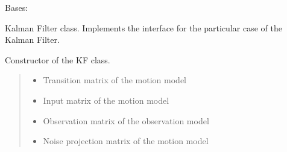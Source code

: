 \documentclass[letterpaper,10pt,english]{sphinxmanual}
\begin{document}
\begin{fulllineitems}
\label{\detokenize{KF:KF.KF}}
\pysigstartsignatures
{}
\pysigstopsignatures
\sphinxAtStartPar
Bases: 

\sphinxAtStartPar
Kalman Filter class. Implements the  interface for the particular case of the Kalman Filter.

\begin{fulllineitems}
\label{\detokenize{KF:KF.KF.__init__}}
\pysigstartsignatures
{}
\pysigstopsignatures
\sphinxAtStartPar
Constructor of the KF class.
\begin{quote}\begin{description}
\begin{itemize}
\item {} 
\sphinxAtStartPar
{} \textendash{} Transition matrix of the motion model

\item {} 
\sphinxAtStartPar
{} \textendash{} Input matrix of the motion model

\item {} 
\sphinxAtStartPar
{} \textendash{} Observation matrix of the observation model

\item {} 
\sphinxAtStartPar
{} \textendash{} Noise projection matrix of the motion model


\end{itemize}
\end{description}
\end{quote}
\end{fulllineitems}
\end{fulllineitems}
\end{document}
